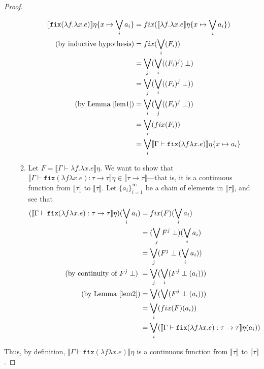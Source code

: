 \begin{proof}
\begin{itemize}
\begin{enumerate}
 \begin{align*}
 \llbracket \texttt{fix} (\lambda f.\lambda x.e)\rrbracket\eta\{x\mapsto \bigvee_i a_i\} &= 
 fix(\llbracket \lambda f. \lambda x.e \rrbracket\eta\{x\mapsto \bigvee_i a_i\})\\
 \text{(by inductive hypothesis)} &= fix(\bigvee_i(F_i)) \\
 &= \bigvee_j(\bigvee_i((F_i)^j )\perp) \\
 &= \bigvee_j(\bigvee_i((F_i)^j \perp)) \\ 
\text{(by Lemma \ref{lem1})} &= \bigvee_i(\bigvee_j((F_i)^j \perp)) \\ 
&= \bigvee_i(fix(F_i))\\
&= \bigvee_i \llbracket \Gamma \vdash \texttt{fix}(\lambda f \lambda x.e)\rrbracket\eta\{x\mapsto a_i\}
 \end{align*}
 \item Let $F = \llbracket \Gamma \vdash \lambda f. \lambda x.e\rrbracket\eta$. We want to show that 
 $\llbracket\Gamma\vdash\texttt{fix}(\lambda f \lambda x.e) : \tau 
 \rightarrow\tau\rrbracket\eta \in \llbracket \tau \rightarrow \tau \rrbracket$---that is, it is a continuous function from 
 $\llbracket \tau \rrbracket$ to $\llbracket \tau \rrbracket$. Let $\{a_i\}^{\infty}_{i=1}$ be a chain of elements in $\llbracket \tau \rrbracket$,
  and see that 
 \begin{align*}
 (\llbracket\Gamma\vdash\texttt{fix}(\lambda f \lambda x.e) : \tau \rightarrow\tau\rrbracket\eta)( \bigvee_i a_i) &= 
 fix(F)(\bigvee_i a_i)\\
 &=(\bigvee_j F^j \perp)(\bigvee_i a_i)\\
 &= \bigvee_j (F^j \perp(\bigvee_i a_i))\\ 
 \text{(by continuity of $F^j \perp$) }&= \bigvee_j(\bigvee_i(F^j \perp(a_i)))\\ 
 \text{(by Lemma \ref{lem2})} &=\bigvee(\bigvee(F^j \perp(a_i))) \\
 &= \bigvee_i(fix(F)(a_i))\\
 &= \bigvee_i(\llbracket\Gamma\vdash\texttt{fix}(\lambda f \lambda x.e) : \tau \rightarrow\tau\rrbracket\eta(a_i))\\
 \end{align*}
 \end{enumerate}
 \end{itemize}
 Thus, by definition, $\llbracket \Gamma \vdash \texttt{fix}(\lambda f \lambda x.e) \rrbracket\eta$ is a continuous function
 from $\llbracket \tau \rrbracket$ to $\llbracket \tau \rrbracket$.
 \end{proof}
